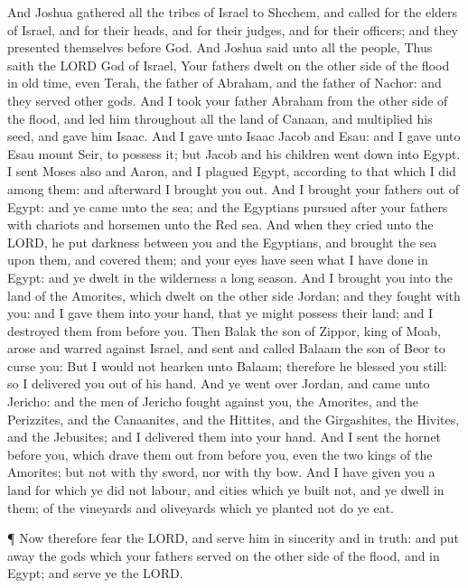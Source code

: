  And Joshua gathered all the tribes of Israel to Shechem,
and called for the elders of Israel, and for their heads, and for their
judges, and for their officers; and they presented themselves before
God.  And Joshua said unto all the people, Thus saith the
LORD God of Israel, Your fathers dwelt on the other side of the flood in
old time, even Terah, the father of Abraham, and the father of Nachor:
and they served other gods.  And I took your father Abraham
from the other side of the flood, and led him throughout all the land of
Canaan, and multiplied his seed, and gave him Isaac.  And I
gave unto Isaac Jacob and Esau: and I gave unto Esau mount Seir, to
possess it; but Jacob and his children went down into Egypt.
 I sent Moses also and Aaron, and I plagued Egypt, according
to that which I did among them: and afterward I brought you out.
 And I brought your fathers out of Egypt: and ye came unto
the sea; and the Egyptians pursued after your fathers with chariots and
horsemen unto the Red sea.  And when they cried unto the
LORD, he put darkness between you and the Egyptians, and brought the sea
upon them, and covered them; and your eyes have seen what I have done in
Egypt: and ye dwelt in the wilderness a long season.  And I
brought you into the land of the Amorites, which dwelt on the other side
Jordan; and they fought with you: and I gave them into your hand, that
ye might possess their land; and I destroyed them from before you.
 Then Balak the son of Zippor, king of Moab, arose and
warred against Israel, and sent and called Balaam the son of Beor to
curse you:  But I would not hearken unto Balaam; therefore
he blessed you still: so I delivered you out of his hand. 
And ye went over Jordan, and came unto Jericho: and the men of Jericho
fought against you, the Amorites, and the Perizzites, and the
Canaanites, and the Hittites, and the Girgashites, the Hivites, and the
Jebusites; and I delivered them into your hand.  And I sent
the hornet before you, which drave them out from before you, even the
two kings of the Amorites; but not with thy sword, nor with thy bow.
 And I have given you a land for which ye did not labour,
and cities which ye built not, and ye dwell in them; of the vineyards
and oliveyards which ye planted not do ye eat.

 ¶ Now therefore fear the LORD, and serve him in sincerity
and in truth: and put away the gods which your fathers served on the
other side of the flood, and in Egypt; and serve ye the LORD.

